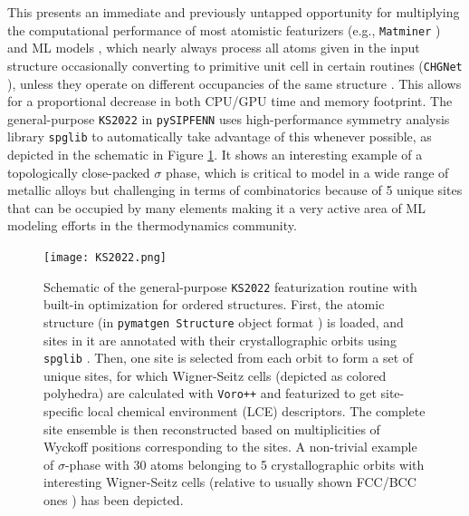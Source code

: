 This presents an immediate and previously untapped opportunity for multiplying the computational performance of most atomistic featurizers (e.g., \texttt{Matminer} \cite{Ward2018Matminer:Mining}) and ML models \cite{Ward2017, Chen2019GraphCrystals, Jha2019IRNet, Krajewski2022ExtensibleNetworks, Choudhary2021AtomisticPredictions, Deng2023CHGNetModelling, Davariashtiyani2023FormationRepresentation, Schmidt2023Machine-Learning-AssistedMaterials, Banik2024EvaluatingMaterials, Hu2021Atomtransmachine:Learning}, which nearly always process all atoms given in the input structure occasionally converting to primitive unit cell in certain routines (\texttt{CHGNet} \cite{Deng2023CHGNetModelling}), unless they operate on different occupancies of the same structure \cite{Crivello2022SupervisedExample}. This allows for a proportional decrease in both CPU/GPU time and memory footprint. The general-purpose \texttt{KS2022} in \texttt{pySIPFENN} uses high-performance symmetry analysis library \texttt{spglib} \cite{Togo2018Spglib:Search} to automatically take advantage of this whenever possible, as depicted in the schematic in Figure \ref{pysipfenn:fig:ks2022}. It shows an interesting example of a topologically close-packed $\sigma$ phase, which is critical to model in a wide range of metallic alloys \cite{Joubert2008CrystalPhase} but challenging in terms of combinatorics because of 5 unique sites that can be occupied by many elements \cite{Choi2019ADesign, Ostrowska2020ThermodynamicW} making it a very active area of ML modeling efforts \cite{Crivello2022SupervisedExample, Zha2024ApplyingEnergy} in the thermodynamics community.

\begin{figure}[h]
    \centering
    \texttt{[image: KS2022.png]}
    \caption{
    Schematic of the general-purpose \texttt{KS2022} featurization routine with built-in optimization for ordered structures. First, the atomic structure (in \texttt{pymatgen Structure} object format \cite{Ong2013PythonAnalysis}) is loaded, and sites in it are annotated with their crystallographic orbits using \texttt{spglib} \cite{Togo2018Spglib:Search}. Then, one site is selected from each orbit to form a set of unique sites, for which Wigner-Seitz cells (depicted as colored polyhedra) are calculated with \texttt{Voro++} \cite{Rycroft2007MultiscaleFlow, Rycroft2009Voro++:C++, Lu2023AnCells} and featurized to get site-specific local chemical environment (LCE) descriptors. The complete site ensemble is then reconstructed based on multiplicities of Wyckoff positions corresponding to the sites. A non-trivial example of $\sigma$-phase with 30 atoms belonging to 5 crystallographic orbits with interesting Wigner-Seitz cells (relative to usually shown FCC/BCC ones \cite{Bohm1996VoronoiLattices}) has been depicted.
    }
    \label{pysipfenn:fig:ks2022}
\end{figure}

